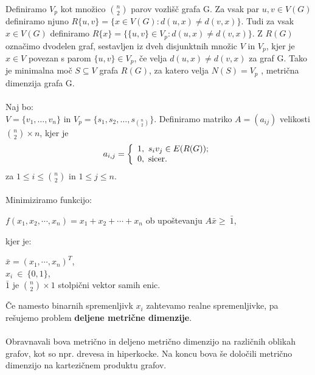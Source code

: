 \documentclass[a4paper]{report}
\begin{document}
Definiramo $V_p$ kot množico $\binom{n}{2}$ parov vozlišč grafa G. Za vsak par $u,v \in V(G)$ definiramo njuno $R\{u,v\}=\{x \in V(G): d(u,x)\neq d(v,x)\}.$ Tudi za vsak $x \in V(G)$ definiramo $R\{x\}= \{\{u,v\}\in V_p: d(u,x)\neq d(v,x)\}$. Z $R(G)$ označimo dvodelen graf, sestavljen iz dveh disjunktnih množic $V$ in $V_p$, kjer je $x \in V$ povezan s parom $\{u,v\} \in V_p$, če velja $d(u,x)\neq d(v,x)$ za graf G.  Tako je minimalna moč $S \subseteq V$ grafa $R(G)$, za katero velja $N(S) = V_p$  , metrična dimenzija grafa G. \\\\
Naj bo:\\
$V = \{v_1,\dots, v_n\}$ in $V_p = \{s_1,s_2,\dots,s_{\binom{n}{2}} \} $. Definiramo matriko  $ A = (a_{ij})$  velikosti $\binom{n}{2} \times n$, kjer je\[ a_{i,j}  =  \left \{ \begin{array}{l}1,\ \mbox{$ s_i v_j \in E(R(G))$}; \\0,\ \mbox{sicer}. \end{array} \right. \]
za $1\le i\le \binom{n}{2}$ in $1\le  j\le n$.\\
\pagebreak
\\
 Minimiziramo funkcijo: \begin{center}$f(x_1,x_2, \cdots,x_n)=x_1+x_2+\cdots+x_n$ 
ob upoštevanju $A\bar{x}\ge\ \bar{1}$,\end{center} 
kjer je: \begin{center}
 $\bar{x}=(x_1,\cdots,x_n)^T$,\\
$x_i\ \in\ \{0,1 \}$,\\
$\bar{1}$ je $\binom{n}{2}\times 1$  stolpični vektor samih enic. \end{center}
Če namesto binarnih spremenljivk $x_i$ zahtevamo realne spremenljivke, pa rešujemo problem \textbf{deljene metrične dimenzije}. \\\\
Obravnavali bova metrično in deljeno metrično dimenzijo na različnih oblikah grafov, kot so npr. drevesa in hiperkocke. Na koncu bova še določili metrično dimenzijo na kartezičnem produktu grafov. 
\end{document}
